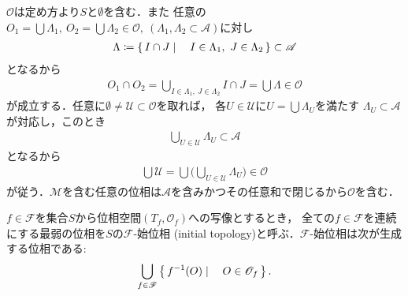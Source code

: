 	\begin{prf}
		$\mathscr{O}$は定め方より$S$と$\emptyset$を含む．また
		任意の$O_1 = \bigcup \Lambda_1,\ O_2=\bigcup \Lambda_2 \in \mathscr{O},\ 
		(\Lambda_1,\Lambda_2 \subset \mathscr{A})$に対し
		\begin{align}
			\Lambda \coloneqq
			\left\{\, I \cap J \mid \quad I \in \Lambda_1,\ J \in \Lambda_2\, \right\} \subset \mathscr{A}
		\end{align}
		となるから
		\begin{align}
			O_1 \cap O_2 = \bigcup_{I \in \Lambda_1,\ J \in \Lambda_2} I \cap J
			= \bigcup \Lambda \in \mathscr{O}
		\end{align}
		が成立する．任意に$\emptyset \neq \mathscr{U} \subset \mathscr{O}$を取れば，
		各$U \in \mathscr{U}$に$U = \bigcup \Lambda_U$を満たす
		$\Lambda_U \subset \mathscr{A}$が対応し，このとき
		\begin{align}
			\bigcup_{U \in \mathscr{U}} \Lambda_U \subset \mathscr{A}
		\end{align}
		となるから
		\begin{align}
			\bigcup \mathscr{U} = \bigcup \Biggl(\bigcup_{U \in \mathscr{U}} \Lambda_U\Biggr)
			\in \mathscr{O}
		\end{align}
		が従う．$\mathscr{M}$を含む任意の位相は$\mathscr{A}$を含みかつその任意和で閉じるから$\mathscr{O}$を含む．
		\QED
	\end{prf}
	
	\begin{screen}
		\begin{thm}[Alexanderの定理]
		\end{thm}
	\end{screen}
	
	\begin{screen}
		\begin{dfn}[始位相]
			$f \in \mathscr{F}$を集合$S$から位相空間$(T_f,\mathscr{O}_f)$への写像とするとき，
			全ての$f \in \mathscr{F}$を連続にする最弱の位相を$S$の$\mathscr{F}$-始位相
			(initial topology)と呼ぶ．$\mathscr{F}$-始位相は次が生成する位相である:
			\begin{align}
				\bigcup_{f \in \mathscr{F}} \left\{\, f^{-1}(O) \mid \quad O \in \mathscr{O}_f\, \right\}.
			\end{align}
		\end{dfn}
	\end{screen}
	
	\begin{screen}
		\begin{dfn}[Cartesian積の位相]
			
		\end{dfn}
	\end{screen}
	
	\begin{screen}
		\begin{dfn}[直積の位相]
			
		\end{dfn}
	\end{screen}